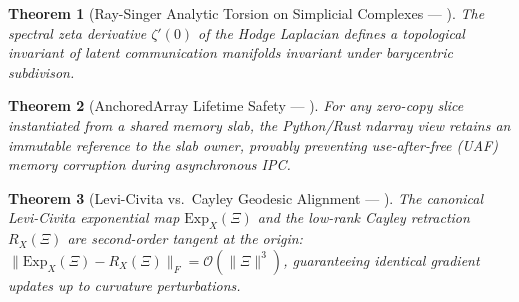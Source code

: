 \documentclass[journal,10pt,compsoc]{IEEEtran}
\theoremstyle{plain}
\newtheorem{theorem}{Theorem}
\theoremstyle{definition}
\begin{document}
\begin{theorem}[Ray-Singer Analytic Torsion on Simplicial Complexes --- \label{thm:polydim_0440}]
The spectral zeta derivative $\zeta'(0)$ of the Hodge Laplacian defines a topological invariant of latent communication manifolds invariant under barycentric subdivison.
\end{theorem}

\begin{theorem}[AnchoredArray Lifetime Safety --- \label{thm:polydim_0691}]
For any zero-copy slice instantiated from a shared memory slab, the Python/Rust ndarray view retains an immutable reference to the slab owner, provably preventing use-after-free (UAF) memory corruption during asynchronous IPC.
\end{theorem}

\begin{theorem}[Levi-Civita vs.\ Cayley Geodesic Alignment --- \label{thm:polydim_0880}]
The canonical Levi-Civita exponential map $\mathrm{Exp}_X(\Xi)$ and the low-rank Cayley retraction $R_X(\Xi)$ are second-order tangent at the origin: $\| \mathrm{Exp}_X(\Xi) - R_X(\Xi) \|_F = \mathcal{O}(\|\Xi\|^3)$, guaranteeing identical gradient updates up to curvature perturbations.
\end{theorem}
\end{document}
